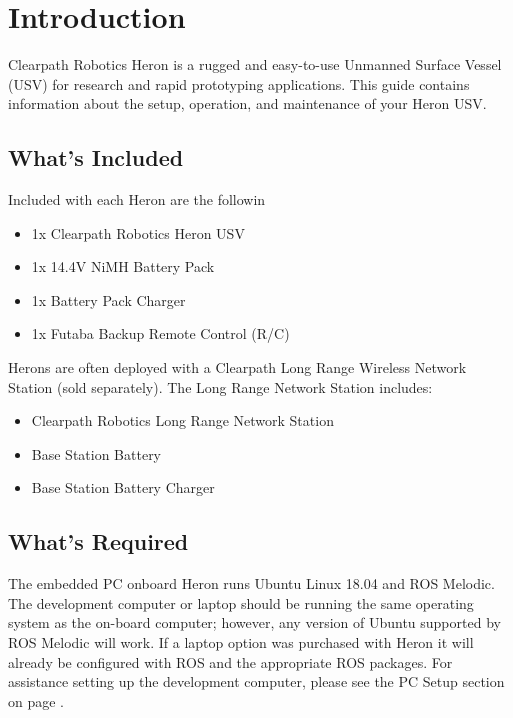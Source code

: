 \documentclass[]{clearpath-latex/clearpath-manual}
\begin{document}
\tableofcontents

\section{Introduction}
Clearpath Robotics Heron is a rugged and easy-to-use Unmanned Surface Vessel (USV) for research and rapid prototyping applications. This guide contains information about the setup, operation, and maintenance of your Heron USV.

\subsection{What's Included}

Included with each Heron are the followin
\begin{itemize}[nolistsep]
	\item 1x Clearpath Robotics Heron USV
	\item 1x 14.4V NiMH Battery Pack
	\item 1x Battery Pack Charger
	\item 1x Futaba Backup Remote Control (R/C)
\end{itemize}

Herons are often deployed with a Clearpath Long Range Wireless Network Station (sold separately). The Long Range Network Station includes:

\begin{itemize}[nolistsep]
	\item Clearpath Robotics Long Range Network Station
	\item Base Station Battery
	\item Base Station Battery Charger
\end{itemize}

\subsection{What's Required}

The embedded PC onboard Heron runs Ubuntu Linux 18.04 and ROS Melodic. The development computer or laptop should be running the same operating system as the on-board computer; however, any version of Ubuntu supported by ROS Melodic will work. If a laptop option was purchased with Heron it will already be configured with ROS and the appropriate ROS packages. For assistance setting up the development computer, please see the PC Setup section on page \pageref{pcsetup}.
\end{document}
